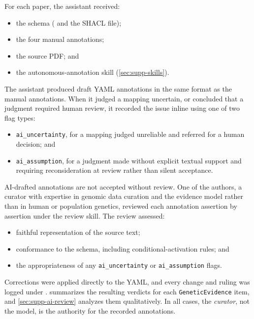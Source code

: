 For each paper, the assistant received:

\begin{itemize}
  \item the schema ( and the SHACL file);
  \item the four manual annotations;
  \item the source PDF; and
  \item the autonomous-annotation skill (\cref{sec:supp-skills}).
\end{itemize}

The assistant produced draft YAML annotations in the same format as the
manual annotations. When it judged a mapping uncertain, or concluded that a
judgment required human review, it recorded the issue inline using one of two
flag types:

\begin{itemize}
  \item \texttt{ai\_uncertainty}, for a mapping judged unreliable and
        referred for a human decision; and
  \item \texttt{ai\_assumption}, for a judgment made without explicit
        textual support and requiring reconsideration at review rather than
        silent acceptance.
\end{itemize}

AI-drafted annotations are not accepted without review. One of the authors,
a curator with expertise in genomic data curation and the evidence model
rather than in human or population genetics, reviewed each annotation
assertion by assertion under the review skill. The review assessed:

\begin{itemize}
  \item faithful representation of the source text;
  \item conformance to the schema, including conditional-activation rules;
        and
  \item the appropriateness of any \texttt{ai\_uncertainty} or
        \texttt{ai\_assumption} flags.
\end{itemize}

Corrections were applied directly to the YAML, and every change and ruling
was logged under .  summarizes the
resulting verdicts for each \texttt{GeneticEvidence} item, and
\cref{sec:supp-ai-review} analyzes them qualitatively. In all cases, the \emph{curator}, not
the model, is the authority for the recorded annotations.

